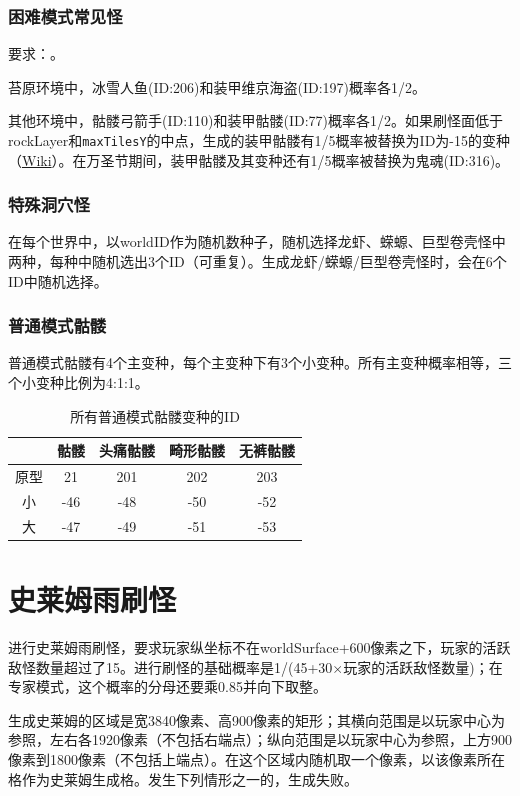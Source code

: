 \subsubsection{困难模式常见怪}\label{app19}
要求：。

苔原环境中，冰雪人鱼(ID:206)和装甲维京海盗(ID:197)概率各1/2。

其他环境中，骷髅弓箭手(ID:110)和装甲骷髅(ID:77)概率各1/2。如果刷怪面低于rockLayer和\lstinline{maxTilesY}的中点，生成的装甲骷髅有1/5概率被替换为ID为-15的变种（\href{https://terraria-zh.gamepedia.com/装甲骷髅}{Wiki}）。在万圣节期间，装甲骷髅及其变种还有1/5概率被替换为鬼魂(ID:316)。

\subsubsection{特殊洞穴怪}\label{app20}
在每个世界中，以worldID作为随机数种子，随机选择龙虾、蝾螈、巨型卷壳怪中两种，每种中随机选出3个ID（可重复）。生成龙虾/蝾螈/巨型卷壳怪时，会在6个ID中随机选择。

\subsubsection{普通模式骷髅}\label{app21}
普通模式骷髅有4个主变种，每个主变种下有3个小变种。所有主变种概率相等，三个小变种比例为4:1:1。
\begin{table}[!ht]
    \centering
    \begin{tabular}{c|cccc}
         &骷髅&头痛骷髅&畸形骷髅&无裤骷髅\\\hline
         原型&21 &201&202&203\\
         小  &-46&-48&-50&-52\\
         大  &-47&-49&-51&-53
    \end{tabular}
    \caption{所有普通模式骷髅变种的ID}
\end{table}

\section{史莱姆雨刷怪}
进行史莱姆雨刷怪，要求玩家纵坐标不在worldSurface+600像素之下，玩家的活跃敌怪数量超过了15。进行刷怪的基础概率是1/(45+30$\times$玩家的活跃敌怪数量)；在专家模式，这个概率的分母还要乘0.85并向下取整。

生成史莱姆的区域是宽3840像素、高900像素的矩形；其横向范围是以玩家中心为参照，左右各1920像素（不包括右端点）；纵向范围是以玩家中心为参照，上方900像素到1800像素（不包括上端点）。在这个区域内随机取一个像素，以该像素所在格作为史莱姆生成格。发生下列情形之一的，生成失败。

